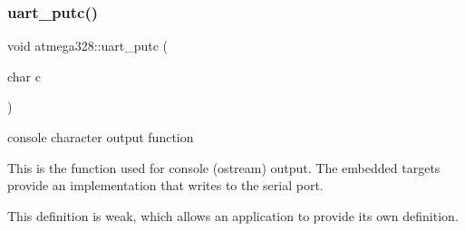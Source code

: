 \subsubsection{\texorpdfstring{uart\+\_\+putc()}{uart\_putc()}}
{\footnotesize\ttfamily void atmega328\+::uart\+\_\+putc (\begin{DoxyParamCaption}\item[{char}]{c }\end{DoxyParamCaption})}

console character output function

This is the function used for console (ostream) output. The embedded targets provide an implementation that writes to the serial port.

This definition is weak, which allows an application to provide its own definition. 